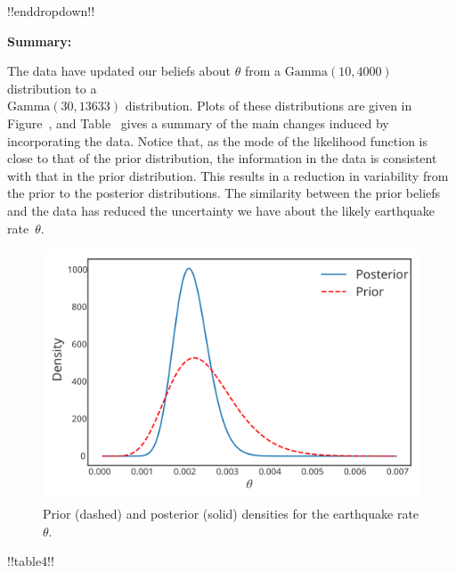 {!!enddropdown!!


\textbf{Summary:}

The data have updated our beliefs about $\theta$ from a
$\mathrm{Gamma}(10,4000)$ distribution to a \\ $\mathrm{Gamma}(30,13633)$ distribution. Plots of
these distributions are given in Figure~, and Table~ gives a summary of the main changes induced by incorporating the data. Notice that, as the mode of the likelihood function is close to that of the prior distribution, the information in the data is consistent with that in the prior distribution. This results in a reduction in variability from the prior to the posterior distributions. The similarity between the prior beliefs and the data has reduced the uncertainty we have about the likely earthquake rate~$\theta$.

\begin{figure}[ht]

\includegraphics{images/priorposterior3.svg}
\caption{Prior (dashed) and posterior (solid) densities for the earthquake rate $\theta$.} 
\label{fig:earthpost}

\end{figure}



!!table4!!}


